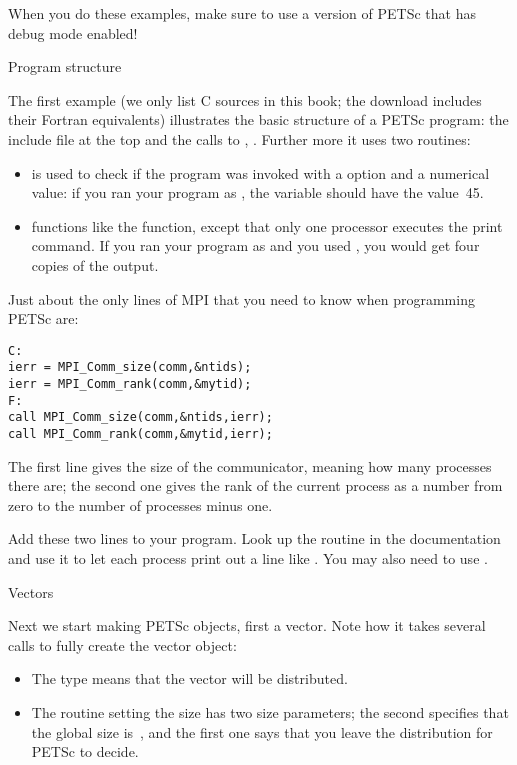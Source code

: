 When you do these examples, make sure to use a version of PETSc that
has debug mode enabled!

 {Program structure}

The first example (we only list C sources in this book; the download
includes their Fortran equivalents) illustrates the basic structure of
a PETSc program: the include file at the top and the calls to
, . Further more it uses two
routines:
\begin{itemize}
\item {} is used to check if the program was
  invoked with a  option and a numerical value: if you ran your
  program as , the variable  should have the
  value~45.
\item {} functions like the  function, except
  that only one processor executes the print command. If you ran your
  program as  and you used , you would
  get four copies of the output.
\end{itemize}


Just about  the only lines
of MPI that you need to know when programming PETSc are:
\begin{verbatim}
C:
ierr = MPI_Comm_size(comm,&ntids);
ierr = MPI_Comm_rank(comm,&mytid);
F:
call MPI_Comm_size(comm,&ntids,ierr);
call MPI_Comm_rank(comm,&mytid,ierr);
\end{verbatim}
The first line gives the size of the communicator, meaning how many
processes there are; the second one gives the rank of the current
process as a number from zero to the number of processes minus one.

\begin{exercise}
Add these two lines to your program.
Look up the routine  in the documentation
and use it to let each process print out a line like . You may also need to use .
\end{exercise}


 {Vectors}

Next we start making PETSc objects, first a vector.
Note how it takes several calls to fully create the vector
object:
\begin{itemize}
\item The type  means that the vector will be distributed.
\item The routine setting the size has two size parameters; the second
  specifies that the global size is~, and the first one says
  that  you leave the distribution for PETSc to decide.
\end{itemize}

